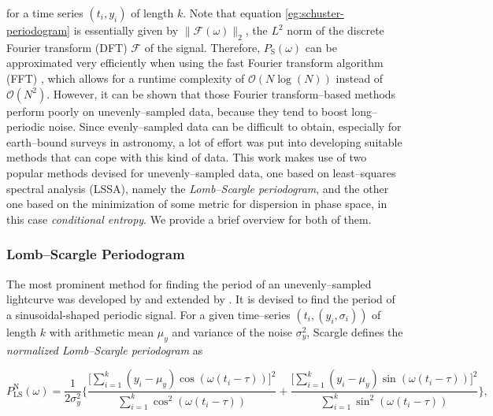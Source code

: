 

for a time series $(t_i, y_i)$ of length $k$. Note that equation \eqref{eg:schuster-periodogram} is essentially given by $\| \mathcal{F}(\omega) \|_2 $, the $L^2$ norm of the discrete Fourier transform (DFT) $\mathcal{F}$ of the signal. Therefore, $P_{\text{S}}(\omega)$ can be approximated very efficiently when using the fast Fourier transform algorithm (FFT) \citep{cooley1965}, which allows for a runtime complexity of $\mathcal{O}(N\log{(N)})$ instead of $\mathcal{O}(N^2)$. However, it can be shown that those Fourier transform--based methods perform poorly on unevenly--sampled data, because they tend to boost long--periodic noise. Since evenly--sampled data can be difficult to obtain, especially for earth--bound surveys in astronomy, a lot of effort was put into developing suitable methods that can cope with this kind of data. This work makes use of two popular methods devised for unevenly--sampled data, one based on least--squares spectral analysis (LSSA), namely the \emph{Lomb--Scargle periodogram}, and the other one based on the minimization of some metric for dispersion in phase space, in this case \emph{conditional entropy}. We provide a brief overview for both of them.

\subsubsection{Lomb--Scargle Periodogram}

The most prominent method for finding the period of an unevenly--sampled lightcurve was developed by \citet{lomb1976} and extended by \citet{scargle1982}. It is devised to find the period of a sinusoidal-shaped periodic signal. For a given time--series $(t_i, (y_i, \sigma_i))$ of length $k$ with arithmetic mean $\mu_y$ and variance of the noise $\sigma_y^2$, Scargle defines the \emph{normalized Lomb--Scargle periodogram} as

\begin{equation}
\label{eq:normalized-lomb-scargle}
P^{\text{N}}_{\text{LS}}(\omega) = \frac{1}{2 \sigma_y^2} \Bigg\{ \frac{\big[\sum\limits_{i=1}^k (y_i - \mu_y) \cos(\omega(t_i - \tau))\big]^2}{\sum\limits_{i=1}^k \cos^2(\omega(t_i - \tau))} + \frac{\big[\sum\limits_{i=1}^k (y_i - \mu_y) \sin(\omega(t_i - \tau))\big]^2}{\sum\limits_{i=1}^k \sin^2(\omega(t_i - \tau))}\Bigg\},
\end{equation}


